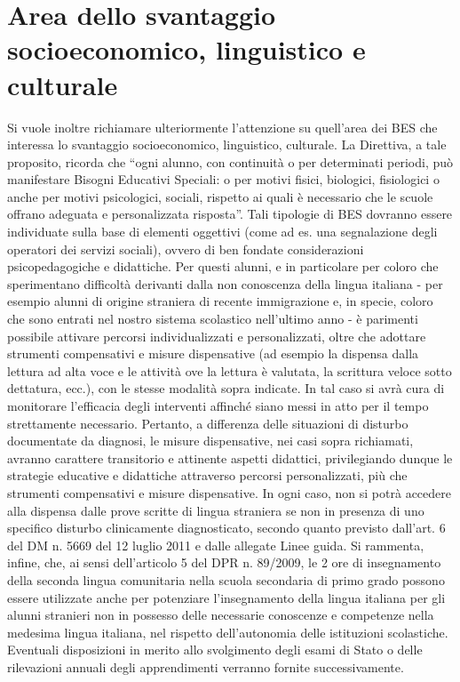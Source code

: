 \section*{Area dello svantaggio socioeconomico, linguistico e culturale}
Si vuole inoltre richiamare ulteriormente l'attenzione su quell'area dei BES che interessa lo
svantaggio socioeconomico, linguistico, culturale. La Direttiva, a tale proposito, ricorda che “ogni
alunno, con continuità o per determinati periodi, può manifestare Bisogni Educativi Speciali: o per
motivi fisici, biologici, fisiologici o anche per motivi psicologici, sociali, rispetto ai quali è
necessario che le scuole offrano adeguata e personalizzata risposta”. Tali tipologie di BES dovranno
essere individuate sulla base di elementi oggettivi (come ad es. una segnalazione degli operatori dei
servizi sociali), ovvero di ben fondate considerazioni psicopedagogiche e didattiche.
Per questi alunni, e in particolare per coloro che sperimentano difficoltà derivanti dalla non
conoscenza della lingua italiana - per esempio alunni di origine straniera di recente immigrazione
e, in specie, coloro che sono entrati nel nostro sistema scolastico nell'ultimo anno - è parimenti
possibile attivare percorsi individualizzati e personalizzati, oltre che adottare strumenti
compensativi e misure dispensative (ad esempio la dispensa dalla lettura ad alta voce e le attività
ove la lettura è valutata, la scrittura veloce sotto dettatura, ecc.), con le stesse modalità sopra
indicate.
In tal caso si avrà cura di monitorare l'efficacia degli interventi affinché siano messi in atto per
il tempo strettamente necessario. Pertanto, a differenza delle situazioni di disturbo documentate da
diagnosi, le misure dispensative, nei casi sopra richiamati, avranno carattere transitorio e attinente
aspetti didattici, privilegiando dunque le strategie educative e didattiche attraverso percorsi
personalizzati, più che strumenti compensativi e misure dispensative.
In ogni caso, non si potrà accedere alla dispensa dalle prove scritte di lingua straniera se non in
presenza di uno specifico disturbo clinicamente diagnosticato, secondo quanto previsto dall'art. 6
del DM n. 5669 del 12 luglio 2011 e dalle allegate Linee guida.
Si rammenta, infine, che, ai sensi dell'articolo 5 del DPR n. 89/2009, le 2 ore di insegnamento
della seconda lingua comunitaria nella scuola secondaria di primo grado possono essere utilizzate
anche per potenziare l'insegnamento della lingua italiana per gli alunni stranieri non in possesso
delle necessarie conoscenze e competenze nella medesima lingua italiana, nel rispetto
dell'autonomia delle istituzioni scolastiche.
Eventuali disposizioni in merito allo svolgimento degli esami di Stato o delle rilevazioni annuali
degli apprendimenti verranno fornite successivamente.
